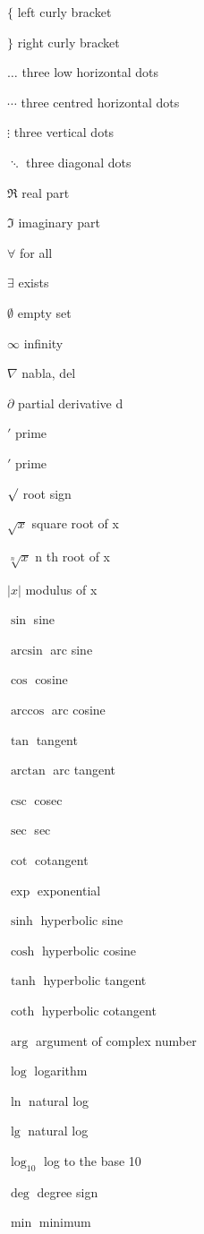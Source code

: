 \documentclass[a4paper]{article}
\begin{document}
$\{$ left curly bracket 

$\}$ right curly bracket 
 
$\dots$ three low horizontal dots 

$\cdots$ three centred horizontal dots 

$\vdots$ three vertical dots 

$\ddots$ three diagonal dots 

$\Re$ real part 

$\Im$ imaginary part 

$\forall$ for all 

$\exists$ exists 

$\emptyset$ empty set 

$\infty$ infinity 

$\nabla$ nabla, del 

$\partial$ partial derivative d 

$'$ prime 

$\prime$ prime 

$\surd$ root sign 
 
$\sqrt{x} $ square root of x 

$\sqrt[n]{x}$ n th root of x 
 
$|x|$ modulus of x 

$\sin$ sine 
 
$\arcsin$ arc sine 

$\cos$ cosine 
 
$\arccos$ arc cosine 

$\tan$ tangent 
 
$\arctan$ arc tangent 

$\csc$ cosec 
 
$\sec$ sec 

$\cot$ cotangent 
 
$\exp$ exponential 

$\sinh$ hyperbolic sine 

$\cosh$ hyperbolic cosine 

$\tanh$ hyperbolic tangent 

$\coth$ hyperbolic cotangent 

$\arg$ argument of complex number 

$\log$ logarithm 

$\ln$ natural log 

$\lg$ natural log 

$\log_{10} $ log to the base 10 

$\deg$ degree sign 

$\min $ minimum 
\end{document}
